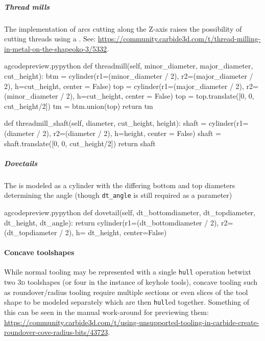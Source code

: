 \documentclass{ltxdoc}
\begin{document}
\subparagraph{Thread mills}

\label{subpara:threadmills}The implementation of arcs cutting along the Z-axis raises the 
possibility of cutting threads using a . 
See: \url{https://community.carbide3d.com/t/thread-milling-in-metal-on-the-shapeoko-3/5332}.

\lstset{firstnumber=\thegcpy}
\begin{writecode}{a}{gcodepreview.py}{python}
    def threadmill(self, minor_diameter, major_diameter, cut_height):
        btm = cylinder(r1=(minor_diameter / 2), r2=(major_diameter / 2), h=cut_height, center = False)
        top = cylinder(r1=(major_diameter / 2), r2=(minor_diameter / 2), h=cut_height, center = False)
        top = top.translate([0, 0, cut_height/2])
        tm = btm.union(top)
        return tm

    def threadmill_shaft(self, diameter, cut_height, height):
        shaft = cylinder(r1=(diameter / 2), r2=(diameter / 2), h=height, center = False)
        shaft = shaft.translate([0, 0, cut_height/2])
        return shaft

\end{writecode}
\addtocounter{gcpy}{12}

\subparagraph{Dovetails}

\label{subpara:dovetails}The  is modeled as a cylinder with the differing bottom and top diameters determining the angle (though \verb|dt_angle| is still required as a parameter)

\lstset{firstnumber=\thegcpy}
\begin{writecode}{a}{gcodepreview.py}{python}
    def dovetail(self, dt_bottomdiameter, dt_topdiameter, dt_height, dt_angle):
        return cylinder(r1=(dt_bottomdiameter / 2), r2=(dt_topdiameter / 2), h= dt_height, center=False)

\end{writecode}
\addtocounter{gcpy}{3}

\paragraph{Concave toolshapes}
\label{para:concavetoolshapes} 
While normal tooling may be represented with a single \texttt{hull} operation betwixt two \textsc{3d} toolshapes (or four in the instance of keyhole tools), concave tooling such as roundover/radius tooling require multiple sections or even slices of the tool shape to be modeled separately which are then \texttt{hull}ed together. Something of this can be seen in the manual work-around for previewing them: \url{https://community.carbide3d.com/t/using-unsupported-tooling-in-carbide-create-roundover-cove-radius-bits/43723}.
\end{document}
